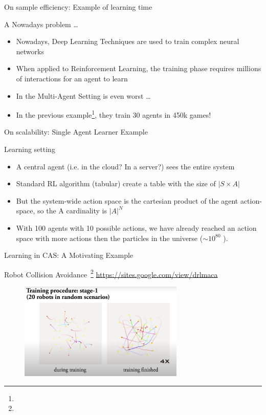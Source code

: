 \documentclass[presentation]{beamer}\mode<presentation>{\usetheme{AMSBolognaFC}}
\begin{document}
\begin{frame}{On sample efficiency: Example of learning time }
	\begin{exampleblock}{A Nowadays problem \dots}
		\begin{itemize}
			\item Nowadays, Deep Learning Techniques are used to train complex neural networks
			\item When applied to Reinforcement Learning, the training phase requires millions of interactions for an agent to learn
			\item In the Multi-Agent Setting is even worst \dots
			\item In the previous example\footnote[frame]{}, they train 30 agents in 450k games!
		\end{itemize}
	\end{exampleblock}
\end{frame}
\begin{frame}{On scalability: Single Agent Learner Example}
	\begin{exampleblock}{Learning setting}
		\begin{itemize}
			\item A central agent (i.e. in the cloud? In a server?) sees the entire system
			\item Standard RL algorithm (tabular) create a table with the size of $|S \times A|$
			\item But the system-wide action space is the cartesian product of the agent action-space, so the A cardinality is $|A|^N$
			\item With 100 agents with 10 possible actions, we have already reached an action space with more actions then the particles in the universe ($\sim 10^{80}$ \href{https://en.wikipedia.org/wiki/Eddington_number}{\faLink}).
		\end{itemize}
	\end{exampleblock}
\end{frame}
\begin{frame}{Learning in CAS: A Motivating Example}
	\begin{exampleblock}{Robot Collision Avoidance~\footnote[frame]{} \url{https://sites.google.com/view/drlmaca}}
		\centering
		\begin{figure}
			\href{https://www.youtube.com/watch?v=Uj1yAmlL5lk}{\includegraphics[width=0.7\textwidth]{img/collective-learning.png}}
		\end{figure}
	\end{exampleblock}
\end{frame}
\end{document}
